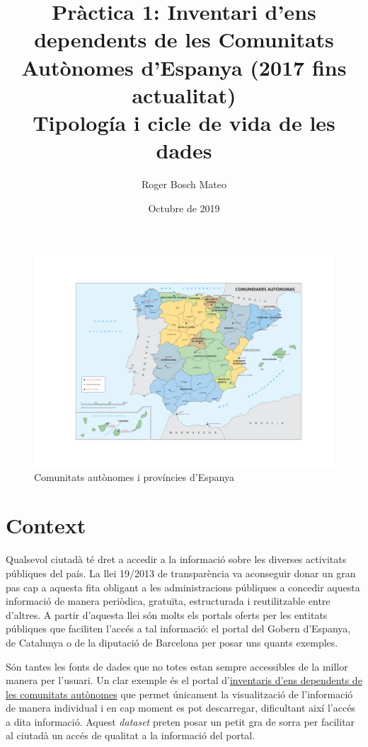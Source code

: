 \documentclass[12pt]{article}
\title{%
Pràctica 1: Inventari d'ens dependents de les Comunitats Autònomes d'Espanya (2017 fins actualitat)\\
\large Tipología i cicle de vida de les dades}
\author{Roger Bosch Mateo}
\date{Octubre de 2019}
\begin{document}
\maketitle

\begin{figure}[H]
    \centering
    \includegraphics[width=1\columnwidth]{img/mapa.pdf}
    \caption{Comunitats autònomes i províncies d'Espanya} 
    \label{flowchart}
\end{figure}

\section*{Context}
Qualsevol ciutadà té dret a accedir a la informació sobre les diverses activitats públiques del país. La llei 19/2013 de transparència va aconseguir donar un gran pas cap a aquesta fita obligant a les administracions públiques a concedir aquesta informació de manera periòdica, gratuïta, estructurada i reutilitzable entre d'altres. A partir d'aquesta llei són molts els portals oferts per les entitats públiques que faciliten l'accés a tal informació: el portal del Gobern d'Espanya, de Catalunya o de la diputació de Barcelona per posar uns quants exemples.\par
Són tantes les fonts de dades que no totes estan sempre accessibles de la millor manera per l'usuari. 
Un clar exemple és el portal d'\href{https://serviciostelematicosext.hacienda.gob.es/SGCIEF/PubInvCCAA/secciones/FrmSelComunidad.aspx}{inventaris d'ens dependents de les comunitats autònomes} que permet únicament la visualització de l'informació de manera individual i en cap moment es pot descarregar, dificultant així l'accés a dita informació.
Aquest \textit{dataset} preten posar un petit gra de sorra per facilitar al ciutadà un accés de qualitat a la informació del portal.
\end{document}
